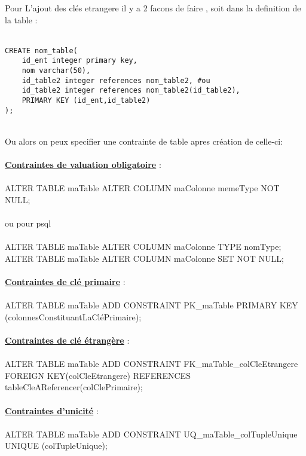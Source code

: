 \documentclass[a4paper,12pt,openany]{book}
\begin{document}
Pour L'ajout des clés etrangere il y a 2 facons de faire , soit dans la definition de la table :\\
\\
\begin{verbatim}
CREATE nom_table(
	id_ent integer primary key,
	nom varchar(50),
	id_table2 integer references nom_table2, #ou
	id_table2 integer references nom_table2(id_table2),
	PRIMARY KEY (id_ent,id_table2)
);
\end{verbatim}
\\
Ou alors on peux specifier une contrainte de table apres création de celle-ci:\\
\\
\underline{\textbf{Contraintes de valuation obligatoire}} :\\
\\
ALTER TABLE maTable ALTER COLUMN maColonne memeType NOT NULL;\\
\\
ou pour psql\\
\\
ALTER TABLE maTable ALTER COLUMN maColonne TYPE nomType;\\
ALTER TABLE maTable ALTER COLUMN maColonne SET NOT NULL;\\
\\
\underline{\textbf{Contraintes de clé primaire}} :\\
\\
ALTER TABLE maTable ADD CONSTRAINT PK\_maTable PRIMARY KEY (colonnesConstituantLaCléPrimaire);\\
\\
\underline{\textbf{Contraintes de clé étrangère}} :\\
\\
ALTER TABLE maTable ADD CONSTRAINT FK\_maTable\_colCleEtrangere FOREIGN KEY(colCleEtrangere) REFERENCES tableCleAReferencer(colClePrimaire);\\
\\
\underline{\textbf{Contraintes d’unicité}} :\\
\\
ALTER TABLE maTable ADD CONSTRAINT UQ\_maTable\_colTupleUnique UNIQUE (colTupleUnique);\\
\end{document}
